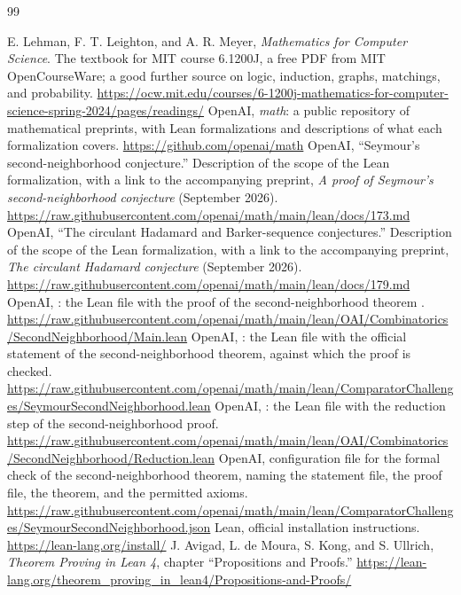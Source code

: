 \renewcommand{\bibname}{References and further reading}
\begin{thebibliography}{99}
\raggedright
{}
 E. Lehman, F. T. Leighton, and A. R. Meyer, \emph{Mathematics for Computer Science}. The textbook for MIT course 6.1200J, a free PDF from MIT OpenCourseWare; a good further source on logic, induction, graphs, matchings, and probability. \url{https://ocw.mit.edu/courses/6-1200j-mathematics-for-computer-science-spring-2024/pages/readings/}
 OpenAI, \emph{math}: a public repository of mathematical preprints, with Lean formalizations and descriptions of what each formalization covers. \url{https://github.com/openai/math}
 OpenAI, ``Seymour's second-neighborhood conjecture.'' Description of the scope of the Lean formalization, with a link to the accompanying preprint, \emph{A proof of Seymour's second-neighborhood conjecture} (September 2026). \url{https://raw.githubusercontent.com/openai/math/main/lean/docs/173.md}
 OpenAI, ``The circulant Hadamard and Barker-sequence conjectures.'' Description of the scope of the Lean formalization, with a link to the accompanying preprint, \emph{The circulant Hadamard conjecture} (September 2026). \url{https://raw.githubusercontent.com/openai/math/main/lean/docs/179.md}
 OpenAI, : the Lean file with the proof of the second-neighborhood theorem . \url{https://raw.githubusercontent.com/openai/math/main/lean/OAI/Combinatorics/SecondNeighborhood/Main.lean}
 OpenAI, : the Lean file with the official statement of the second-neighborhood theorem, against which the proof is checked. \url{https://raw.githubusercontent.com/openai/math/main/lean/ComparatorChallenges/SeymourSecondNeighborhood.lean}
 OpenAI, : the Lean file with the reduction step of the second-neighborhood proof. \url{https://raw.githubusercontent.com/openai/math/main/lean/OAI/Combinatorics/SecondNeighborhood/Reduction.lean}
 OpenAI, configuration file for the formal check of the second-neighborhood theorem, naming the statement file, the proof file, the theorem, and the permitted axioms. \url{https://raw.githubusercontent.com/openai/math/main/lean/ComparatorChallenges/SeymourSecondNeighborhood.json}
 Lean, official installation instructions. \url{https://lean-lang.org/install/}
 J. Avigad, L. de Moura, S. Kong, and S. Ullrich, \emph{Theorem Proving in Lean 4}, chapter ``Propositions and Proofs.'' \url{https://lean-lang.org/theorem_proving_in_lean4/Propositions-and-Proofs/}

\end{thebibliography}

